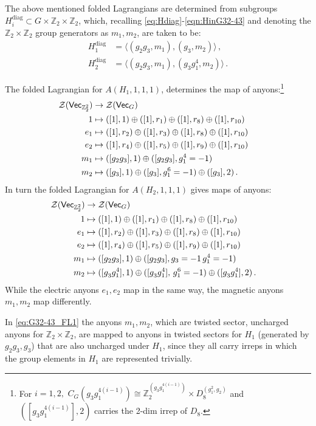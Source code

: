 \documentclass[aps,twocolumn,prx,floatfix,preprintnumbers, nofootinbib,10pt]{revtex4-2}
\numberwithin{equation}{section}
\theoremstyle{definition}
\newcommand{\be}{\begin{equation}}
\newcommand{\ee}{\end{equation}}
\newcommand{\ba}{\begin{aligned}}
\newcommand{\ea}{\end{aligned}}
\newcommand{\Z}{{\mathbb Z}}
\newcommand{\cZ}{\mathcal{Z}}
\renewcommand{\Vec}{\mathsf{Vec}}
\newcommand{\diag}{\text{diag}}
\begin{document}
The above mentioned folded Lagrangians are determined from subgroups $H^\diag_i\subset G\times\Z_2\times\Z_2$, which, recalling \eqref{eq:Hdiag}-\eqref{eqn:HinG32-43} and denoting the $\Z_2\times\Z_2$ group generators as $m_1,m_2$, are taken to be: 
\be\ba
    H^\diag_1&=\langle (g_2g_3,m_1), (g_3,m_2) \rangle\,,\\
    H^\diag_2&=\langle (g_2g_3,m_1), (g_3g_1^4,m_2) \rangle\,.
\ea\ee

The folded Lagrangian for $A(H_1, 1, 1, 1)$, determines the map of anyons:\footnote{For $i=1,2,$ $C_G(g_3 g_1^{4(i-1)})\cong\Z_2^{(g_3g_1^{4(i-1)})}\times D_8^{(g_1^2,g_2)}$ and $([g_3g_1^{4(i-1)}],2)$ carries the 2-dim irrep of $D_8$.}
\be\ba \label{eq:G32-43_FL1}
\cZ(\Vec_{\Z_2^2}) & \rightarrow \cZ(\Vec_G) \cr
1  & \mapsto ([1],1)\oplus([1],r_1)\oplus([1],r_8)\oplus([1],r_{10})\cr
e_1  & \mapsto   ([1], r_2) \oplus ([1], r_3) \oplus([1],r_8)\oplus([1],r_{10})\cr
e_2  & \mapsto  ([1], r_4) \oplus ([1], r_5) \oplus ([1], r_{9}) \oplus ([1], r_{10} )\cr
m_1  & \mapsto ([g_2 g_3],1) \oplus ([g_2 g_3], g_1^4=-1)\cr
m_2  & \mapsto ([g_3],1) \oplus ([g_3], g_1^6=-1) \oplus ([g_3],2)\,.\cr
\ea\ee
In turn the folded Lagrangian for $A(H_2, 1, 1, 1)$ gives maps of anyons:
\be\ba \label{eq:G32-43_FL2}
\cZ(\Vec_{\Z_2^2}) & \rightarrow \cZ(\Vec_G) \cr
1  & \mapsto ([1],1)\oplus([1],r_1)\oplus([1],r_8)\oplus([1],r_{10})\cr
e_1  & \mapsto   ([1], r_2) \oplus ([1], r_3) \oplus([1],r_8)\oplus([1],r_{10})\cr
e_2  & \mapsto  ([1], r_4) \oplus ([1], r_5) \oplus ([1], r_{9}) \oplus ([1], r_{10} )\cr
m_1  & \mapsto  ([g_2 g_3],1) \oplus ([g_2 g_3], g_3=-1 \,g_1^4=-1)\cr
m_2  & \mapsto  ([g_3^{\phantom{-1}}\!\!\!\! g_1^4],1) \oplus ([g_3^{\phantom{-1}}\!\!\!\! g_1^4],\,g_1^6=-1) \oplus ([g_3^{\phantom{-1}}\!\!\!\! g_1^4],2)\,.\cr
\ea\ee
While the electric anyons $e_1, e_2$ map in the same way, the magnetic anyons $m_1, m_2$ map differently.

In \eqref{eq:G32-43_FL1} the anyons $m_1,m_2$, which are twisted sector, uncharged anyons for $\Z_2\times\Z_2$, are mapped to anyons in twisted sectors for $H_1$ (generated by $g_2g_3,g_3$) that are also uncharged under $H_1$, since they all carry irreps in which the group elements in $H_1$ are represented trivially. 
\end{document}
